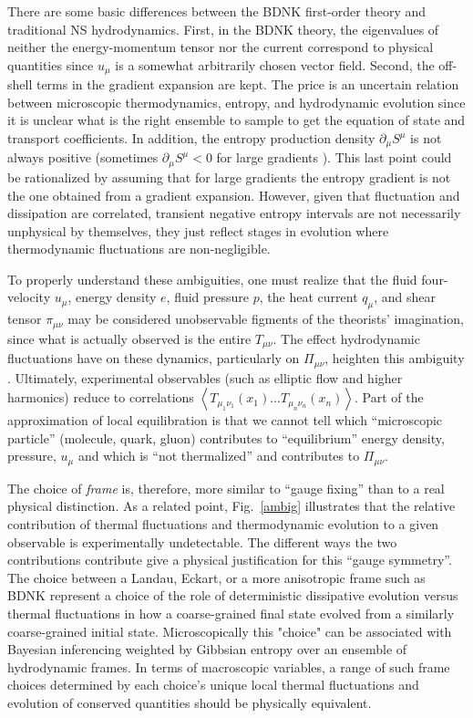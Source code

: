 \documentclass[12pt,onecolumn,showpacs,amssymb,aps,nofootinbib,floatfix]{revtex4-2}
\newcommand{\ave}[1]{\left\langle #1 \right\rangle}
\begin{document}
There are some basic differences between the BDNK first-order theory and traditional NS hydrodynamics. First, in the BDNK theory, the eigenvalues of neither the energy-momentum tensor nor the current correspond to physical quantities since $u_\mu$ is a somewhat arbitrarily chosen vector field. Second, the off-shell terms in the gradient expansion are kept. The price is an uncertain relation between microscopic thermodynamics, entropy, and hydrodynamic evolution since it is unclear what is the right ensemble to sample to get the equation of state and transport coefficients. In addition, the entropy production density $\partial_\mu S^\mu$ is not always positive (sometimes $\partial_\mu S^\mu <0$ for large gradients \cite{gavassino,ShokryTaghi2020,GavaUeit2021}). This last point could be rationalized by assuming that for large gradients the entropy gradient is not the one obtained from a gradient expansion. However, given that fluctuation and dissipation are correlated, transient negative entropy intervals are not necessarily unphysical by themselves, they just reflect stages in evolution where thermodynamic fluctuations are non-negligible.
	
	To properly understand these ambiguities, one must realize that the fluid four-velocity $u_{\mu}$, energy density $e$, fluid pressure $p$, the heat current $q_\mu$, and shear tensor $\pi_{\mu \nu}$ may be considered unobservable figments of the theorists' imagination, since what is actually observed is the entire $T_{\mu \nu}$. 
	The effect hydrodynamic fluctuations have on these dynamics, particularly on $\Pi_{\mu \nu}$, heighten this ambiguity \cite{crooks}.
	Ultimately, experimental observables (such as elliptic flow and higher harmonics) reduce to correlations $\ave{T_{\mu_1 \nu_1}(x_1)...T_{\mu_n \nu_n}(x_n)}$. Part of the approximation of local equilibration is that we cannot tell which ``microscopic particle'' (molecule, quark, gluon) contributes to ``equilibrium'' energy density, pressure, $u_\mu$ and which is ``not thermalized'' and contributes to $\Pi_{\mu \nu}$. 
	
 	The choice of \textit{frame} is, therefore, more similar to ``gauge fixing'' than to a real physical distinction.   As a related point, Fig.~\ref{ambig} illustrates that the relative contribution of thermal fluctuations and thermodynamic evolution to a given observable is experimentally undetectable.   The different ways the two contributions contribute give a physical justification for this ``gauge symmetry''. The choice between a Landau, Eckart, or a more anisotropic frame such as BDNK represent a choice of the role of deterministic dissipative evolution versus thermal fluctuations in how a coarse-grained final state evolved from a similarly coarse-grained initial state.  Microscopically this "choice" can be associated with Bayesian inferencing weighted by Gibbsian entropy \cite{jaynes} over an ensemble of hydrodynamic frames. In terms of macroscopic variables, a range of such frame choices determined by each choice's unique local thermal fluctuations and evolution of conserved quantities should be physically equivalent.
\end{document}

